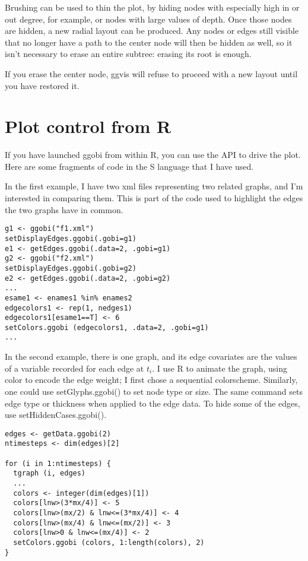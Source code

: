 \documentclass[11pt]{article}
\begin{document}
Brushing can be used to thin the plot, by hiding nodes with especially
high in or out degree, for example, or nodes with large values of depth.
Once those nodes are hidden, a new radial layout can be produced.
Any nodes or edges still visible that no longer have a path to the
center node will then be hidden as well, so it isn't necessary to erase
an entire subtree: erasing its root is enough.

If you erase the center node, ggvis will refuse to proceed with
a new layout until you have restored it.

\section{Plot control from R}

If you have launched ggobi from within R, you can use the API to
drive the plot.  Here are some fragments of code in the S language
that I have used.

In the first example, I have two xml files representing two
related graphs, and I'm interested in comparing them.  This is
part of the code used to highlight the edges the two graphs
have in common.

\begin{verbatim}
g1 <- ggobi("f1.xml")
setDisplayEdges.ggobi(.gobi=g1)
e1 <- getEdges.ggobi(.data=2, .gobi=g1)
g2 <- ggobi("f2.xml")
setDisplayEdges.ggobi(.gobi=g2)
e2 <- getEdges.ggobi(.data=2, .gobi=g2)
...
esame1 <- enames1 %in% enames2
edgecolors1 <- rep(1, nedges1)
edgecolors1[esame1==T] <- 6
setColors.ggobi (edgecolors1, .data=2, .gobi=g1)
...
\end{verbatim}


In the second example, there is one graph, and its edge covariates are
the values of a variable recorded for each edge at $t_i$.  I use R to
animate the graph, using color to encode the edge weight; I first chose
a sequential colorscheme.  Similarly, one could use setGlyphs.ggobi() to
set node type or size.  The same command sets edge type or thickness
when applied to the edge data.  To hide some of the edges, use
setHiddenCases.ggobi().

\begin{verbatim}
edges <- getData.ggobi(2)
ntimesteps <- dim(edges)[2]

for (i in 1:ntimesteps) {
  tgraph (i, edges)
  ...
  colors <- integer(dim(edges)[1])
  colors[lnw>(3*mx/4)] <- 5
  colors[lnw>(mx/2) & lnw<=(3*mx/4)] <- 4
  colors[lnw>(mx/4) & lnw<=(mx/2)] <- 3
  colors[lnw>0 & lnw<=(mx/4)] <- 2
  setColors.ggobi (colors, 1:length(colors), 2)
}
\end{verbatim}
\end{document}
